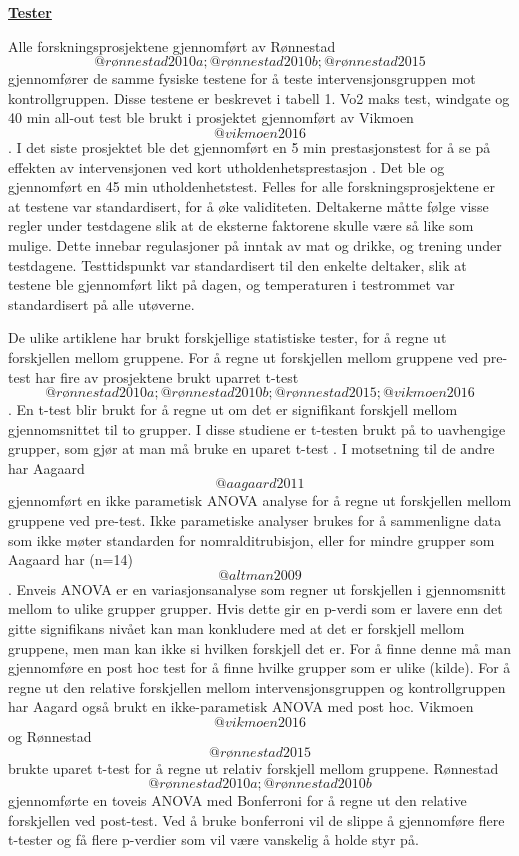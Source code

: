 \documentclass[
]{book}
\begin{document}
\underline{\textbf{Tester}}

Alle forskningsprosjektene gjennomført av Rønnestad \[@rønnestad2010a; @rønnestad2010b; @rønnestad2015\] gjennomfører de samme fysiske testene for å teste intervensjonsgruppen mot kontrollgruppen. Disse testene er beskrevet i tabell 1. Vo2 maks test, windgate og 40 min all-out test ble brukt i prosjektet gjennomført av Vikmoen \[@vikmoen2016\]. I det siste prosjektet ble det gjennomført en 5 min prestasjonstest for å se på effekten av intervensjonen ved kort utholdenhetsprestasjon \citep{aagaard2011}. Det ble og gjennomført en 45 min utholdenhetstest. Felles for alle forskningsprosjektene er at testene var standardisert, for å øke validiteten. Deltakerne måtte følge visse regler under testdagene slik at de eksterne faktorene skulle være så like som mulige. Dette innebar regulasjoner på inntak av mat og drikke, og trening under testdagene. Testtidspunkt var standardisert til den enkelte deltaker, slik at testene ble gjennomført likt på dagen, og temperaturen i testrommet var standardisert på alle utøverne.

De ulike artiklene har brukt forskjellige statistiske tester, for å regne ut forskjellen mellom gruppene. For å regne ut forskjellen mellom gruppene ved pre-test har fire av prosjektene brukt uparret t-test \[@rønnestad2010a; @rønnestad2010b; @rønnestad2015; @vikmoen2016\]. En t-test blir brukt for å regne ut om det er signifikant forskjell mellom gjennomsnittet til to grupper. I disse studiene er t-testen brukt på to uavhengige grupper, som gjør at man må bruke en uparet t-test \citep{kim2015}. I motsetning til de andre har Aagaard \[@aagaard2011\] gjennomført en ikke parametisk ANOVA analyse for å regne ut forskjellen mellom gruppene ved pre-test. Ikke parametiske analyser brukes for å sammenligne data som ikke møter standarden for nomralditrubisjon, eller for mindre grupper som Aagaard har (n=14) \[@altman2009\]. Enveis ANOVA er en variasjonsanalyse som regner ut forskjellen i gjennomsnitt mellom to ulike grupper grupper. Hvis dette gir en p-verdi som er lavere enn det gitte signifikans nivået kan man konkludere med at det er forskjell mellom gruppene, men man kan ikke si hvilken forskjell det er. For å finne denne må man gjennomføre en post hoc test for å finne hvilke grupper som er ulike (kilde). For å regne ut den relative forskjellen mellom intervensjonsgruppen og kontrollgruppen har Aagard også brukt en ikke-parametisk ANOVA med post hoc. Vikmoen \[@vikmoen2016\] og Rønnestad \[@rønnestad2015\] brukte uparet t-test for å regne ut relativ forskjell mellom gruppene. Rønnestad \[@rønnestad2010a; @rønnestad2010b\] gjennomførte en toveis ANOVA med Bonferroni for å regne ut den relative forskjellen ved post-test. Ved å bruke bonferroni vil de slippe å gjennomføre flere t-tester og få flere p-verdier som vil være vanskelig å holde styr på.
\end{document}
